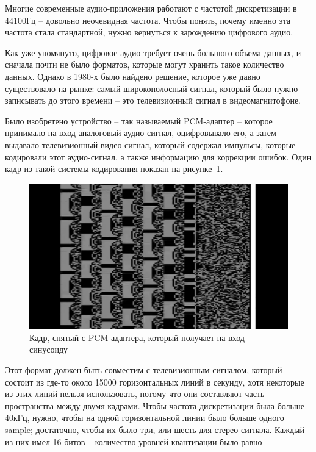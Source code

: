 \documentclass[a4page]{article}
\begin{document}
Многие современные аудио-приложения работают с частотой дискретизации в 44100Гц --
довольно неочевидная частота.
Чтобы понять, почему именно эта частота стала стандартной,
нужно вернуться к зарождению цифрового аудио.

Как уже упомянуто, цифровое аудио требует очень большого объема данных,
и сначала почти не было форматов, которые могут хранить такое количество данных.
Однако в 1980-х было найдено решение, которое уже давно существовало на рынке:
самый широкополосный сигнал, который было нужно записывать до этого времени -- это телевизионный сигнал в видеомагнитофоне.

Было изобретено устройство -- так называемый PCM-адаптер -- которое принимало на вход аналоговый аудио-сигнал,
оцифровывало его, а затем выдавало телевизионный видео-сигнал,
который содержал импульсы, которые кодировали этот аудио-сигнал,
а также информацию для коррекции ошибок. Один кадр из такой системы кодирования показан на рисунке~\ref{fig:pcm-adapter-vid}.


\begin{figure}
  \includegraphics[width=\linewidth]{pcm-adapter-frame.jpg}
  \caption{Кадр, снятый с PCM-адаптера, который получает на вход синусоиду~\cite{web:pcm-adapter-vid}}
  \label{fig:pcm-adapter-vid}
\end{figure}

Этот формат должен быть совместим с телевизионным сигналом,
который состоит из где-то около 15000 горизонтальных линий в секунду,
хотя некоторые из этих линий нельзя использовать, потому что они составляют часть пространства между двумя кадрами.
Чтобы частота дискретизации была больше 40кГц, нужно, чтобы на одной горизонтальной линии было больше одного sample;
достаточно, чтобы их было три, или шесть для стерео-сигнала.
Каждый из них имел 16 битов -- количество уровней квантизации было равно 
\end{document}
